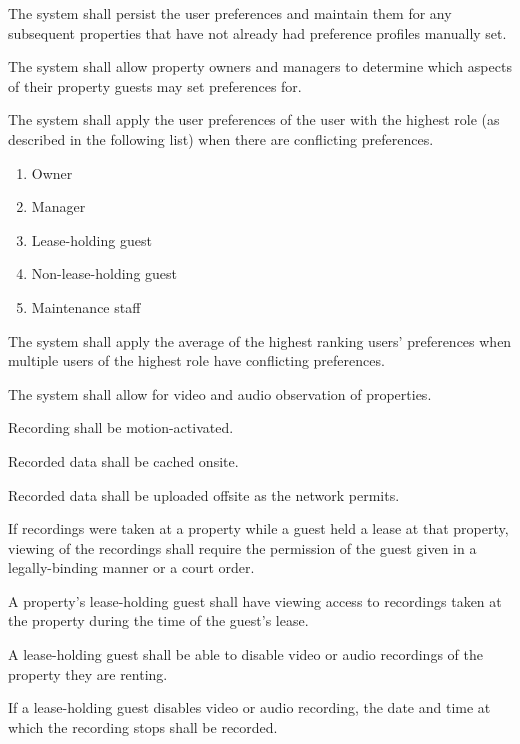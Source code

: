 \documentclass[letter,titlepage,oneside,english]{report}
\begin{document}
\begin{fr}
\begin{fr}
  \item
    The system shall persist the user preferences and maintain them for any subsequent properties that have not already had preference profiles manually set.
  \item
    The system shall allow property owners and managers to determine which aspects of their property guests may set preferences for.
  \item\label{fr:preferences:order}
    The system shall apply the user preferences of the user with the highest role (as described in the following list) when there are conflicting preferences.
    \begin{enumerate}
    \item
      Owner
    \item
      Manager
    \item
      Lease-holding guest
    \item
      Non-lease-holding guest
    \item
      Maintenance staff
    \end{enumerate}
  \item
    The system shall apply the average of the highest ranking users' preferences when multiple users of the highest role have conflicting preferences.
  \end{fr}
\item
  The system shall allow for video and audio observation of properties.
  \begin{fr}
  \item
    Recording shall be motion-activated.
  \item
    Recorded data shall be cached onsite.
  \item
    Recorded data shall be uploaded offsite as the network permits.
  \item
    If recordings were taken at a property while a guest held a lease at that property, viewing of the recordings shall require the permission of the guest given in a legally-binding manner or a court order.
  \item
    A property's lease-holding guest shall have viewing access to recordings taken at the property during the time of the guest's lease.
  \item
    A lease-holding guest shall be able to disable video or audio recordings of the property they are renting.
    \begin{fr}
    \item
      If a lease-holding guest disables video or audio recording, the date and time at which the recording stops shall be recorded.

\end{fr}
\end{fr}
\end{fr}
\end{document}
